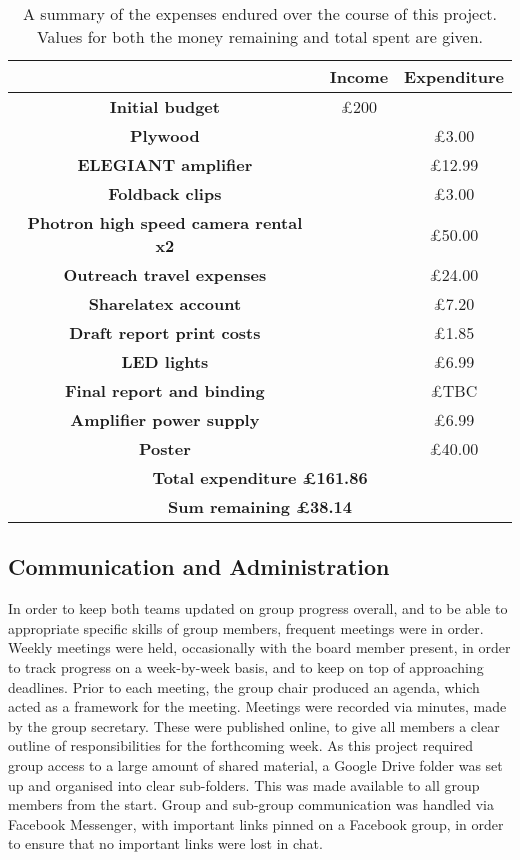 \bigskip                    
\begin{table}
\centering
\begin{tabular}{|c|c|c|}
\hline
&\textbf{Income}& \textbf{Expenditure}\\
\hline
\textbf{Initial budget}& \pounds200&  \\
\textbf{Plywood}& &\pounds3.00  \\
\textbf{ELEGIANT amplifier}& &\pounds12.99  \\
\textbf{Foldback clips}& &\pounds3.00  \\
\textbf{Photron high speed camera rental x2}& &\pounds50.00  \\
\textbf{Outreach travel expenses}& &\pounds24.00  \\
\textbf{Sharelatex account}& &\pounds7.20  \\
\textbf{Draft report print costs}& &\pounds1.85  \\
\textbf{LED lights}& &\pounds6.99  \\
\textbf{Final report and binding}& &\pounds TBC  \\
\textbf{Amplifier power supply}& &\pounds6.99  \\
\textbf{Poster}& &\pounds 40.00  \\
\hline
\multicolumn{3}{|c|}{\textbf{Total expenditure \pounds161.86}}\\
\hline
\multicolumn{3}{|c|}{\textbf{Sum remaining \pounds38.14}}\\
\hline
\end{tabular}
\caption{A summary of the expenses endured over the course of this project. Values for both the money remaining and total spent are given.}
\label{table:budget}
\end{table}

\subsection{Communication and Administration}
In order to keep both teams updated on group progress overall, and to be able to appropriate specific skills of group members, frequent meetings were in order. Weekly meetings were held, occasionally with the board member present, in order to track progress on a week-by-week basis, and to keep on top of approaching deadlines. Prior to each meeting, the group chair produced an agenda, which acted as a framework for the meeting. Meetings were recorded via minutes, made by the group secretary. These were published online, to give all members a clear outline of responsibilities for the forthcoming week. As this project required group access to a large amount of shared material, a Google Drive folder was set up and organised into clear sub-folders. This was made available to all group members from the start. Group and sub-group communication was handled via Facebook Messenger, with important links pinned on a Facebook group, in order to ensure that no important links were lost in chat. 

